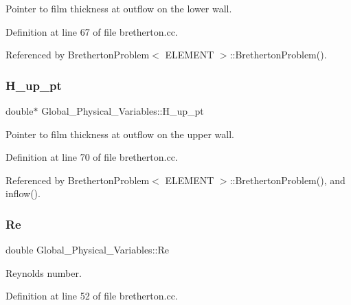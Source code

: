 Pointer to film thickness at outflow on the lower wall. 



Definition at line 67 of file bretherton.\+cc.



Referenced by Bretherton\+Problem$<$ E\+L\+E\+M\+E\+N\+T $>$\+::\+Bretherton\+Problem().

\mbox{\label{namespaceGlobal__Physical__Variables_a83a3a82f89784013805bd23d63faa7e3}} 
\subsubsection{\texorpdfstring{H\+\_\+up\+\_\+pt}{H\_up\_pt}}
{\footnotesize\ttfamily double$\ast$ Global\+\_\+\+Physical\+\_\+\+Variables\+::\+H\+\_\+up\+\_\+pt}



Pointer to film thickness at outflow on the upper wall. 



Definition at line 70 of file bretherton.\+cc.



Referenced by Bretherton\+Problem$<$ E\+L\+E\+M\+E\+N\+T $>$\+::\+Bretherton\+Problem(), and inflow().

\mbox{\label{namespaceGlobal__Physical__Variables_ab814e627d2eb5bc50318879d19ab16b9}} 
\subsubsection{\texorpdfstring{Re}{Re}}
{\footnotesize\ttfamily double Global\+\_\+\+Physical\+\_\+\+Variables\+::\+Re}



Reynolds number. 



Definition at line 52 of file bretherton.\+cc.




